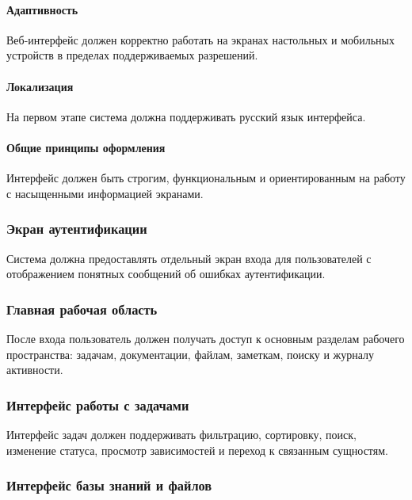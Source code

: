 \paragraph{Адаптивность}

Веб-интерфейс должен корректно работать на экранах настольных и мобильных устройств в пределах поддерживаемых разрешений.

\paragraph{Локализация}

На первом этапе система должна поддерживать русский язык интерфейса.

\paragraph{Общие принципы оформления}

Интерфейс должен быть строгим, функциональным и ориентированным на работу с насыщенными информацией экранами.

\subsubsection{Экран аутентификации}

Система должна предоставлять отдельный экран входа для пользователей с отображением понятных сообщений об ошибках аутентификации.

\subsubsection{Главная рабочая область}

После входа пользователь должен получать доступ к основным разделам рабочего пространства: задачам, документации, файлам, заметкам, поиску и журналу активности.

\subsubsection{Интерфейс работы с задачами}

Интерфейс задач должен поддерживать фильтрацию, сортировку, поиск, изменение статуса, просмотр зависимостей и переход к связанным сущностям.

\subsubsection{Интерфейс базы знаний и файлов}

